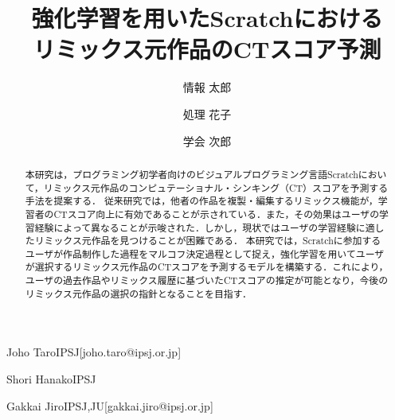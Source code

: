 \documentclass[submit,techrep,noauthor]{ipsj}
\begin{document}
\title{強化学習を用いたScratchにおける\\
リミックス元作品のCTスコア予測}





\author{情報 太郎}{Joho Taro}{IPSJ}[joho.taro@ipsj.or.jp]
\author{処理 花子}{Shori Hanako}{IPSJ}
\author{学会 次郎}{Gakkai Jiro}{IPSJ,JU}[gakkai.jiro@ipsj.or.jp]

\begin{abstract}
本研究は，プログラミング初学者向けのビジュアルプログラミング言語Scratchにおいて，リミックス元作品のコンピュテーショナル・シンキング（CT）スコアを予測する手法を提案する．
従来研究では，他者の作品を複製・編集するリミックス機能が，学習者のCTスコア向上に有効であることが示されている．また，その効果はユーザの学習経験によって異なることが示唆された．しかし，現状ではユーザの学習経験に適したリミックス元作品を見つけることが困難である．
本研究では，Scratchに参加するユーザが作品制作した過程をマルコフ決定過程として捉え，強化学習を用いてユーザが選択するリミックス元作品のCTスコアを予測するモデルを構築する．これにより，ユーザの過去作品やリミックス履歴に基づいたCTスコアの推定が可能となり，今後のリミックス元作品の選択の指針となることを目指す．
\end{abstract}


%
%
%

\maketitle
\end{document}
